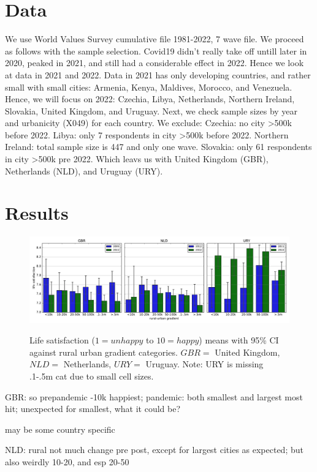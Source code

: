 \documentclass[10pt, letterpaper]{article}
\begin{document}
\begin{spacing}{1.4}
  
\section{Data}

We use World Values Survey cumulative file 1981-2022, 7 wave file. We proceed as
follows with the sample selection. Covid19 didn't really take off untill later
in 2020, peaked in 2021, and still had a considerable effect in 2022. Hence we
look at data in 2021 and 2022. Data in 2021 has only developing countries, and
rather small with small cities: Armenia, Kenya, Maldives, Morocco, and
Venezuela. Hence, we will focus on 2022: Czechia, Libya, Netherlands, Northern
Ireland, Slovakia, United Kingdom, and Uruguay. Next, we check sample sizes by
year and urbanicity (X049) for each country. We exclude:  Czechia: no city >500k
before 2022. Libya: only 7 respondents in city >500k before 2022. Northern
Ireland: total sample size is 447 and only one wave. Slovakia: only 61
respondents in city >500k pre 2022. Which leavs us with United Kingdom (GBR),
Netherlands (NLD), and Uruguay (URY).

\section{Results}

\begin{figure}[H]
 \includegraphics[width=7in]{bar.pdf}\centering\label{bar}
\caption{Life satisfaction ($1=unhappy$ to $10=happy$) means with 95\% CI against rural urban gradient categories. $GBR=$ United Kingdom, $NLD=$ Netherlands, $URY=$ Uruguay. Note: URY is missing .1-.5m cat due to small cell sizes.}
 \end{figure}


GBR: so prepandemic -10k happiest; pandemic: both smallest and largest most hit; unexpected for smallest, what it could be?

may be some country specific


NLD: rural not much change pre post, except for largest cities as expected; but also weirdly 10-20, and esp 20-50



\end{spacing}
\end{document}
